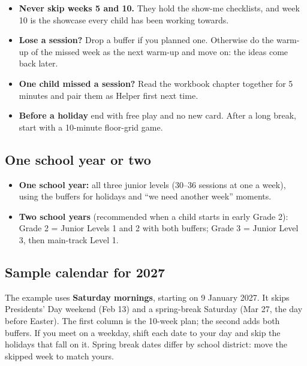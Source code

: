 \documentclass[track=junior,level=1,teacher]{kidscode}
\begin{document}
\begin{tip}
\begin{itemize}[itemsep=2pt]
  \item \textbf{Never skip weeks 5 and 10.} They hold the show-me checklists, and week 10 is the
        showcase every child has been working towards.
  \item \textbf{Lose a session?} Drop a buffer if you planned one. Otherwise do the warm-up of the
        missed week as the next warm-up and move on: the ideas come back later.
  \item \textbf{One child missed a session?} Read the workbook chapter together for 5 minutes and pair
        them as Helper first next time.
  \item \textbf{Before a holiday} end with free play and no new card. After a long break, start with a
        10-minute floor-grid game.
\end{itemize}
\end{tip}

\subsection{One school year or two}
\begin{itemize}[itemsep=2pt]
  \item \textbf{One school year:} all three junior levels (30--36 sessions at one a week), using the
        buffers for holidays and \enquote{we need another week} moments.
  \item \textbf{Two school years} (recommended when a child starts in early Grade 2):
        Grade 2 = Junior Levels 1 and 2 with both buffers; Grade 3 = Junior Level 3, then main-track Level 1.
\end{itemize}

\subsection{Sample calendar for 2027}
The example uses \textbf{Saturday mornings}, starting on 9 January 2027. It skips Presidents' Day
weekend (Feb 13) and a spring-break Saturday (Mar 27, the day before Easter). The first column is the
10-week plan; the second adds both buffers. If you meet on a weekday, shift each date to your day and
skip the holidays that fall on it. Spring break dates differ by school district: move the skipped
week to match yours.
\end{document}
